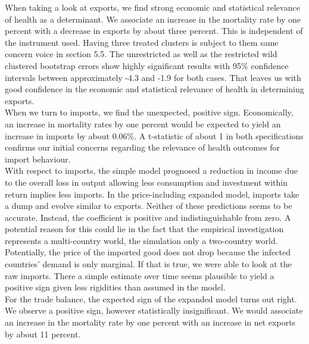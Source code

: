 \documentclass{article}
\begin{document}
When taking a look at exports, we find strong economic and statistical relevance of health as a determinant. We associate an increase in the mortality rate by one percent with a decrease in exports by about three percent. This is independent of the instrument used. Having three treated clusters is subject to them same concern voice in section 5.5. The unrestricted as well as the restricted wild clustered bootstrap errors show highly significant results with 95\% confidence intervals between approximately -4.3 and -1.9 for both cases. That leaves us with good confidence in the economic and statistical relevance of health in determining exports.\\
When we turn to imports, we find the unexpected, positive sign.  Economically, an increase in mortality rates by one percent would be expected to yield an increase in imports by about 0.06\%. A t-statistic of about 1 in both specifications confirms our initial concerns regarding the relevance of health outcomes for import behaviour. \\
With respect to imports, the simple model prognosed a reduction in income due to the overall loss in output allowing less consumption and investment within return implies less imports. In the price-including expanded model, imports take a dump and evolve similar to exports. Neither of these predictions seems to be accurate. Instead, the coefficient is positive and indistinguishable from zero. A potential reason for this could lie in the fact that the empirical investigation represents a multi-country world, the simulation only a two-country world. Potentially, the price of the imported good does not drop because the infected countries' demand is only marginal. If that is true, we were able to look at the raw imports. There a simple estimate over time seems plausible to yield a positive sign given less rigidities than assumed in the model.\\
For the trade balance, the expected sign of the expanded model turns out right. We observe a positive sign, however statistically insignificant. We would associate an increase in the mortality rate by one percent with an increase in net exports by about 11 percent.
\end{document}
